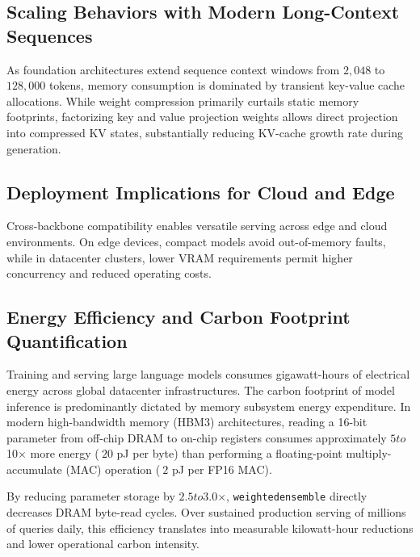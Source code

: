 \subsection{Scaling Behaviors with Modern Long-Context Sequences}
As foundation architectures extend sequence context windows from $2{,}048$ to $128{,}000$ tokens, memory consumption is dominated by transient key-value cache allocations. While weight compression primarily curtails static memory footprints, factorizing key and value projection weights allows direct projection into compressed KV states, substantially reducing KV-cache growth rate during generation.

\subsection{Deployment Implications for Cloud and Edge}
Cross-backbone compatibility enables versatile serving across edge and cloud environments. On edge devices, compact models avoid out-of-memory faults, while in datacenter clusters, lower VRAM requirements permit higher concurrency and reduced operating costs.

\subsection{Energy Efficiency and Carbon Footprint Quantification}
Training and serving large language models consumes gigawatt-hours of electrical energy across global datacenter infrastructures. The carbon footprint of model inference is predominantly dictated by memory subsystem energy expenditure. In modern high-bandwidth memory (HBM3) architectures, reading a 16-bit parameter from off-chip DRAM to on-chip registers consumes approximately $5$\times$ to $10$\times$ more energy ($~20$ pJ per byte) than performing a floating-point multiply-accumulate (MAC) operation ($~2$ pJ per FP16 MAC).

By reducing parameter storage by $2.5$\times$ to $3.0$\times$, \texttt{weightedensemble} directly decreases DRAM byte-read cycles. Over sustained production serving of millions of queries daily, this efficiency translates into measurable kilowatt-hour reductions and lower operational carbon intensity.
